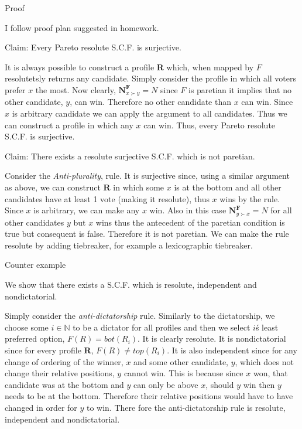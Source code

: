 \documentclass[12pt]{article}
\newcommand{\N}{\mathbb{N}}
\newenvironment{answer}[2][Answer]{\begin{trivlist}
\item[\hskip \labelsep {\bfseries #1}\hskip \labelsep {\bfseries #2:}]}{\end{trivlist}}
\begin{document}
\begin{answer}{a)}{Proof}

I follow proof plan suggested in homework.

Claim: Every Pareto resolute S.C.F. is surjective.

It is always possible to construct a profile $\boldsymbol{R}$ which, when mapped by $F$ resolutetsly returns any candidate.
Simply consider the profile in which all voters prefer $x$ the most. Now clearly, $\mathbf{N}^{\mathbf{F}}_{x\succ y}=N$ since $F$ is paretian it implies that no other candidate, $y$, can win. Therefore no other candidate than $x$ can win. Since $x$ is arbitrary candidate we can apply the argument to all candidates. Thus we can construct a profile in which any $x$ can win. Thus, every Pareto resolute S.C.F. is surjective.

Claim: There exists a resolute surjective S.C.F. which is not paretian.

Consider the \textit{Anti-plurality}, rule. It is surjective since, using a similar argument as above, we can construct $\boldsymbol{R}$ in which some $x$ is at the bottom and all other candidates have at least 1 vote (making it resolute), thus $x$ wins by the rule. Since $x$ is arbitrary, we can make any $x$ win. Also in this case $\mathbf{N}^{\mathbf{F}}_{y\succ x}=N$ for all other candidates $y$ but $x$ wins thus the antecedent of the paretian condition is true but consequent is false. Therefore it is not paretian. We can make the rule resolute by adding tiebreaker, for example a lexicographic tiebreaker.
\end{answer}
\begin{answer}{b)}{Counter example}

We show that there exists a S.C.F. which is resolute, independent and nondictatorial.

Simply consider the \textit{anti-dictatorship} rule. Similarly to the dictatorship, we choose some $i \in \N$ to be a dictator for all profiles and then we select $i$\'s least preferred option, $F(R)=bot(R_i)$. It is clearly resolute. It is nondictatorial since for every profile $\boldsymbol{R}$, $F(R) \neq top(R_i)$. It is also independent since for any change of ordering of the winner, $x$ and some other candidate, $y$, which does not change their relative positions, $y$ cannot win. This is because since $x$ won, that candidate was at the bottom and $y$ can only be above $x$, should $y$ win then $y$ needs to be at the bottom. Therefore their relative positions would have to have changed in order for $y$ to win. There fore the anti-dictatorship rule is resolute, independent and nondictatorial.
\end{answer}
\end{document}
